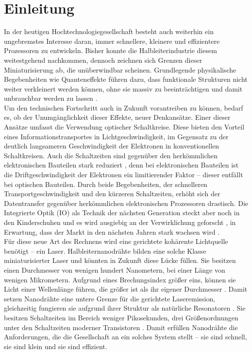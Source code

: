 \chapter{Einleitung}
In der heutigen Hochtechnologiegesellschaft besteht auch weiterhin ein \mbox{ungebremstes} Interesse daran, immer schnellere, kleinere und effizientere Prozessoren zu \mbox{entwickeln}. Bisher konnte die Halbleiterindustrie diesem weitestgehend nachkommen, dennoch zeichnen sich Grenzen dieser Miniaturisierung ab, die unüberwindbar scheinen. Grundlegende physikalische Begebenheiten wie Quanteneffekte führen dazu, dass funktionale  Strukturen nicht weiter verkleinert werden können, ohne sie massiv zu beeinträchtigen und damit unbrauchbar werden zu lassen \cite{Moore.2017}.\\ 
Um den technischen Fortschritt auch in Zukunft vorantreiben zu können, bedarf es, ob der Unumgänglichkeit dieser Effekte, neuer Denkansätze. Einer dieser Ansätze umfasst die Verwendung optischer Schaltkreise. Diese bieten den Vorteil eines Informationstransportes in Lichtgeschwindigkeit, im Gegensatz zu der deutlich langsameren \mbox{Geschwindigkeit} der Elektronen in konventionellen Schaltkreisen. Auch die Schaltzeiten sind gegenüber den herkömmlichen elektronischen Bauteilen stark reduziert \cite{Simonite.2010,Johnson.2015}, denn bei elektronischen Bauteilen ist die Driftgeschwindigkeit der Elektronen ein limitierender Faktor – dieser entfällt bei optischen Bauteilen. Durch beide \mbox{Begebenheiten}, der schnelleren Transportgeschwindigkeit und den kürzeren Schaltzeiten, \mbox{erhöht} sich der Datentransfer gegenüber herkömmlichen elektronischen Prozessoren drastisch. Die Integrierte Optik (IO) als Technik der nächsten Generation steckt aber noch in den Kinderschuhen und es wird ausgiebig an der Verwirklichung geforscht \cite{Touch.2017}, in Erwartung, dass der Markt in den nächsten Jahren stark wachsen wird \cite{Credence.2017}.\\
Für diese neue Art des Rechnens wird eine gerichtete kohärente Lichtquelle benötigt – ein Laser. Halbleiternanodrähte bilden eine solche Klasse miniaturisierter Laser und könnten in Zukunft diese Lücke füllen. Sie besitzen einen Durchmesser von wenigen hundert Nanometern, bei einer Länge von wenigen Mikrometern. Aufgrund eines \mbox{Brechungsindex} größer eins, können sie Licht einer Wellenlänge führen, die größer ist als ihr eigener Durchmesser \cite{Zimmler.2010}. Damit setzen Nanodrähte eine untere Grenze für die gerichtete Laseremission, gleichzeitig fungieren sie aufgrund ihrer Struktur als natürliche Resonatoren \cite{Eichhorn.2013}. Sie besitzen Schaltzeiten im Bereich weniger Pikosekunden, drei Größenordnungen unter den Schaltzeiten moderner Transistoren \cite{Sidiropoulos.2014,Qiu.2017}. Damit erfüllen Nanodrähte die Anforderungen, die die Gesellschaft an ein solches System stellt – sie sind schnell, sie sind klein und sie sind effizient.\\
